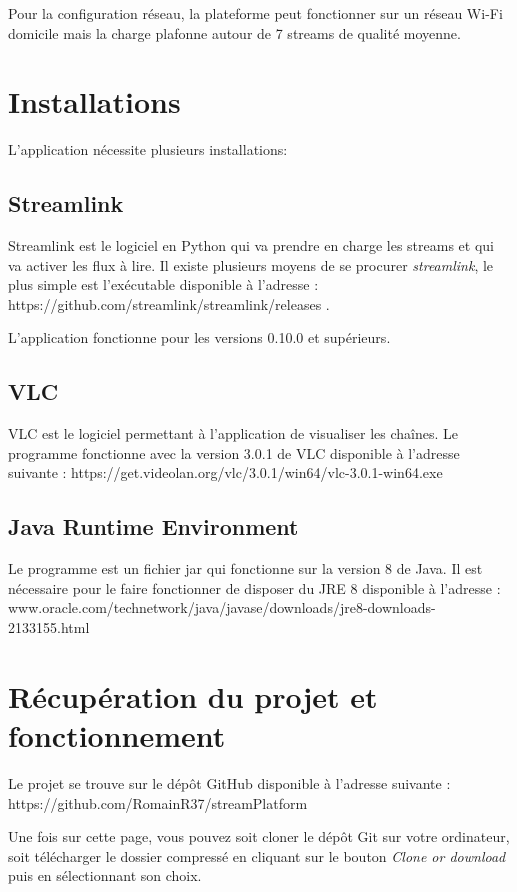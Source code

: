 \documentclass{polytech/polytech}
\begin{document}
Pour la configuration réseau, la plateforme peut fonctionner sur un réseau Wi-Fi domicile mais la charge plafonne autour de 7 streams de qualité moyenne.


\section{Installations}

L'application nécessite plusieurs installations:

\subsection{Streamlink}

Streamlink est le logiciel en Python qui va prendre en charge les streams et qui va activer les flux à lire. Il existe plusieurs moyens de se procurer \textit{streamlink}, le plus simple est l'exécutable disponible à l'adresse : https://github.com/streamlink/streamlink/releases .

L'application fonctionne pour les versions 0.10.0 et supérieurs.

\subsection{VLC}

VLC est le logiciel permettant à l'application de visualiser les chaînes. Le programme  fonctionne avec la version 3.0.1 de VLC disponible à l'adresse suivante : https://get.videolan.org/vlc/3.0.1/win64/vlc-3.0.1-win64.exe


\subsection{Java Runtime Environment}

Le programme est un fichier jar qui fonctionne sur la version 8 de Java. Il est nécessaire pour le faire fonctionner de disposer du JRE 8 disponible à l'adresse : www.oracle.com/technetwork/java/javase/downloads/jre8-downloads-2133155.html


\section{Récupération du projet et fonctionnement}

Le projet se trouve sur le dépôt GitHub disponible à l'adresse suivante : https://github.com/RomainR37/streamPlatform

Une fois sur cette page, vous pouvez soit cloner le dépôt Git sur votre ordinateur, soit télécharger le dossier compressé en cliquant sur le bouton \textit{Clone or download} puis en sélectionnant son choix.
\end{document}
